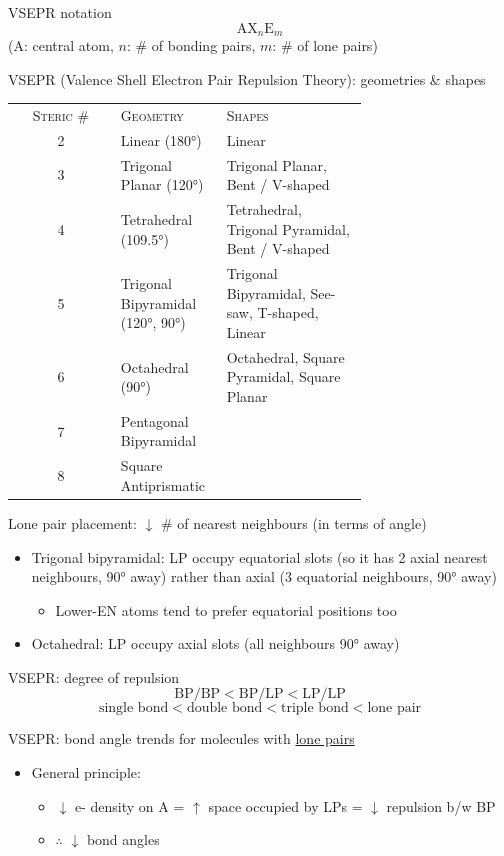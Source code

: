 \documentclass[10pt,landscape]{article}
\newcommand{\extraline}{\vspace{1em}}
\newcommand{\tableindent}{\hspace{1.5em}}
\begin{document}
\begin{multicols}{3}
VSEPR notation
\[ \text{AX}_n\text{E}_m \]
\tableindent (A: central atom, $n$: \# of bonding pairs, $m$: \# of lone pairs) \\
\extraline


VSEPR (Valence Shell Electron Pair Repulsion Theory): geometries \& shapes

\begin{tabular}{@{\tableindent}cp{0.3\linewidth}<{\raggedright}p{0.4\linewidth}<{\raggedright}@{}}
\textsc{Steric \#} & \textsc{Geometry} & \textsc{Shapes} \\ 
2 & Linear (180°) 
	& Linear \\
3 & Trigonal Planar (120°)
	& Trigonal Planar, Bent / V-shaped \\
4 & Tetrahedral (109.5°)
	& Tetrahedral, Trigonal Pyramidal, Bent / V-shaped  \\
5 & Trigonal Bipyramidal (120°, 90°)
	& Trigonal Bipyramidal, See-saw, T-shaped, Linear  \\
6 & Octahedral (90°)
	& Octahedral, Square Pyramidal, Square Planar \\
7 & Pentagonal Bipyramidal & \\ %
8 & Square Antiprismatic & \\ %
\end{tabular}
\extraline

Lone pair placement:  $\downarrow$ \# of nearest neighbours (in terms of angle)
\begin{itemize}
	\item Trigonal bipyramidal: LP occupy equatorial slots (so it has 2 axial nearest neighbours, 90° away) rather than axial (3 equatorial neighbours, 90° away)
	\begin{itemize}	
		\item Lower-EN atoms tend to prefer equatorial positions too
	\end{itemize}
	\item Octahedral: LP occupy axial slots (all neighbours 90° away)
\end{itemize}


VSEPR: degree of repulsion
\[ \text{BP/BP} < \text{BP/LP} < \text{LP/LP} \]
\[ \text{single bond} < \text{double bond} < \text{triple bond} < \text{lone pair} \]

VSEPR: bond angle trends for molecules with \underline{lone pairs}
\begin{itemize}
\item General principle: 
	\begin{itemize}
		\item  $\downarrow$ e- density on A = $\uparrow$ space occupied by LPs = $\downarrow$ repulsion b/w BP 
		\item $\therefore$ $\downarrow$ bond angles
	\end{itemize}


\end{itemize}
\end{multicols}
\end{document}

